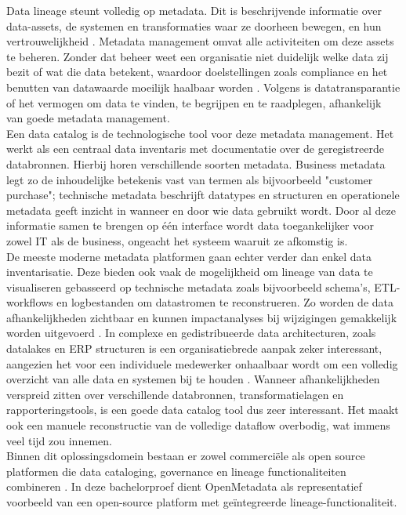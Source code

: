 Data lineage steunt volledig op metadata. Dit is beschrijvende informatie over data-assets, de systemen en transformaties waar ze doorheen bewegen, en hun vertrouwelijkheid \autocite{eichler2021enterprise}. Metadata management omvat alle activiteiten om deze assets te beheren. Zonder dat beheer weet een organisatie niet duidelijk welke data zij bezit of wat die data betekent, waardoor doelstellingen zoals compliance en het benutten van datawaarde moeilijk haalbaar worden \autocite{eichler2021enterprise}. Volgens \textcite{eichler2021enterprise} is datatransparantie of het vermogen om data te vinden, te begrijpen en te raadplegen, afhankelijk van goede metadata management.\\

Een data catalog is de technologische tool voor deze metadata management. Het werkt als een centraal data inventaris met documentatie over de geregistreerde databronnen. Hierbij horen verschillende soorten metadata. Business metadata legt zo de inhoudelijke betekenis vast van termen als bijvoorbeeld "customer purchase"; technische metadata beschrijft datatypes en structuren en operationele metadata geeft inzicht in wanneer en door wie data gebruikt wordt. Door al deze informatie samen te brengen op één interface wordt data toegankelijker voor zowel IT als de business, ongeacht het systeem waaruit ze afkomstig is.\\

De meeste moderne metadata platformen gaan echter verder dan enkel data in\-ven\-tarisatie. Deze bieden ook vaak de mogelijkheid om lineage van data te visualiseren gebasseerd op technische metadata zoals bijvoorbeeld schema's, ETL-workflows en logbestanden om datastromen te reconstrueren. Zo worden de data afhan\-kelijk\-heden zichtbaar en kunnen impact\-analyses bij wijzigingen gemakkelijk worden uitgevoerd \autocite{verma2024tracing}. In complexe en gedistribueerde data architecturen, zoals datalakes en ERP structuren is een organisatiebrede aanpak zeker interessant, aangezien het voor een individuele medewerker onhaalbaar wordt om een volledig overzicht van alle data en systemen bij te houden \autocite{eichler2021enterprise}. Wanneer afhankelijkheden verspreid zitten over verschillende databronnen, transformatielagen en rapporteringstools, is een goede data catalog tool dus zeer interessant. Het maakt ook een manuele reconstructie van de volledige dataflow overbodig, wat immens veel tijd zou innemen.\\

Binnen dit oplossingsdomein bestaan er zowel commerciële als open source platformen die data cataloging, governance en lineage functionaliteiten combineren \autocite{eichler2021enterprise}. In deze bachelorproef dient OpenMetadata als representatief voorbeeld van een open-source platform met geïntegreerde lineage-functionaliteit.\\

